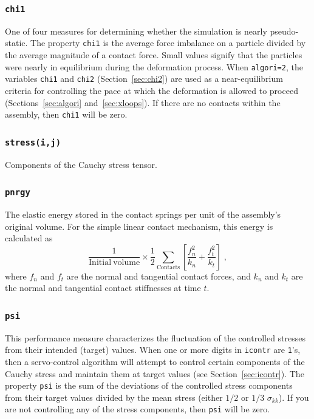 \documentclass[letterpaper,11pt]{article}
\begin{document}
\subsubsection{\texttt{chi1}}\label{sec:chi1}
One of four measures for determining whether the simulation is nearly
pseudo-static.
The property \texttt{chi1} is the average force imbalance on a particle
divided by the average magnitude of a contact force.
Small values signify that the particles were nearly in equilibrium 
during the deformation process.
When \texttt{algori=2},
the variables \texttt{chi1} and \texttt{chi2} (Section~\ref{sec:chi2})
are used as a near-equilibrium criteria
for controlling the pace at which the deformation is allowed to proceed
(Sections~\ref{sec:algori} and~\ref{sec:xloops}).
If there are no contacts within the assembly, then \texttt{chi1} will be zero.
%
\subsubsection{\texttt{stress(i,j)}}
Components of the Cauchy stress tensor.
%
\subsubsection{\texttt{pnrgy}}
The elastic energy stored in the contact springs per unit of the assembly's
original volume.
For the simple linear contact mechanism,
this energy is calculated as
\begin{equation}
\frac{1}{\mathrm{Initial\ volume}}
\times
\frac{1}{2}
\sum_{\text{Contacts}} \left[
\frac{f_{n}^{2}}{k_{n}}
+
\frac{f_{t}^{2}}{k_{t}}
\right]\;,
\end{equation}
where $f_{n}$ and $f_{t}$ are the normal and tangential contact forces,
and $k_{n}$ and $k_{t}$ are the normal and tangential contact
stiffnesses at time $t$.
%
\subsubsection{\texttt{psi}}\label{sec:psi}
This performance measure
characterizes the fluctuation of the controlled stresses from
their intended (target) values. 
When one or more digits in \texttt{icontr} are \texttt{1}'s, then
a servo-control algorithm will attempt
to control certain components of the Cauchy stress 
and maintain them at target values (see Section~\ref{sec:icontr}).
The property \texttt{psi} is the sum of the deviations of the controlled
stress components from their
target values divided by the mean stress
(either $1/2$ or $1/3$ $\sigma_{kk}$).
If you are not controlling any of the stress components, then \texttt{psi}
will be zero.
%
\end{document}
